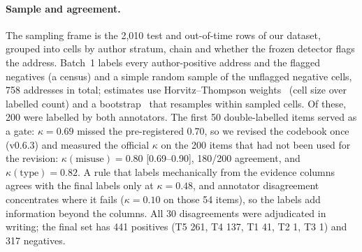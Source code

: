\documentclass[runningheads]{llncs}
\begin{document}
\paragraph{Sample and agreement.} The sampling frame is the 2{,}010 test and
out-of-time rows of our dataset, grouped into cells by author stratum, chain and
whether the frozen detector flags the address. Batch~1 labels every
author-positive address and the flagged negatives (a census) and a simple random
sample of the unflagged negative cells, 758 addresses in total; estimates use
Horvitz--Thompson weights~\cite{horvitz1952} (cell size over labelled count)
and a bootstrap~\cite{efron1979bootstrap} that resamples within sampled cells. Of these, 200 were labelled by both annotators.
The first 50 double-labelled items served as a gate: $\kappa=0.69$ missed the
pre-registered 0.70, so we revised the codebook once (v0.6.3) and measured the
official $\kappa$ on the 200 items that had not been used for the revision:
$\kappa(\text{misuse})=0.80$ [0.69--0.90], 180/200 agreement, and
$\kappa(\text{type})=0.82$. A rule that labels mechanically from the evidence
columns agrees with the final labels only at $\kappa=0.48$, and annotator
disagreement concentrates where it fails ($\kappa=0.10$ on those 54 items), so
the labels add information beyond the columns. All 30 disagreements were
adjudicated in writing; the final set has 441 positives (T5 261, T4 137, T1 41,
T2 1, T3 1) and 317 negatives.
\end{document}
